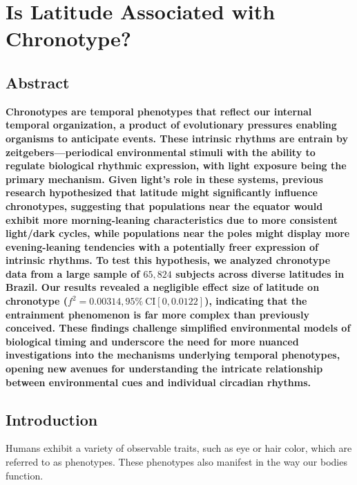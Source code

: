 \documentclass[
12pt,
openright,
oneside,
a4paper,
chapter=TITLE,
section=TITLE,
french,
spanish,
brazil,
english
]{abntex2}
\newlength{\hugeskipamount}
\begin{document}
\vspace{\hugeskipamount}


\chapter{Is Latitude Associated with
Chronotype?}\label{sec-latitude-hypothesis-article}

\section{Abstract}\label{abstract}

\noindent \textbf{Chronotypes are temporal phenotypes that reflect our
internal temporal organization, a product of evolutionary pressures
enabling organisms to anticipate events. These intrinsic rhythms are
entrain by zeitgebers---periodical environmental stimuli with the
ability to regulate biological rhythmic expression, with light exposure
being the primary mechanism. Given light's role in these systems,
previous research hypothesized that latitude might significantly
influence chronotypes, suggesting that populations near the equator
would exhibit more morning-leaning characteristics due to more
consistent light/dark cycles, while populations near the poles might
display more evening-leaning tendencies with a potentially freer
expression of intrinsic rhythms. To test this hypothesis, we analyzed
chronotype data from a large sample of \(65,824\) subjects across
diverse latitudes in Brazil. Our results revealed a negligible effect
size of latitude on chronotype
(\(f^2 = 0.00314, 95\% \ \text{CI}[0, 0.0122]\)), indicating that the
entrainment phenomenon is far more complex than previously conceived.
These findings challenge simplified environmental models of biological
timing and underscore the need for more nuanced investigations into the
mechanisms underlying temporal phenotypes, opening new avenues for
understanding the intricate relationship between environmental cues and
individual circadian rhythms.}

\section{Introduction}\label{introduction}

Humans exhibit a variety of observable traits, such as eye or hair
color, which are referred to as phenotypes. These phenotypes also
manifest in the way our bodies function.
\end{document}
